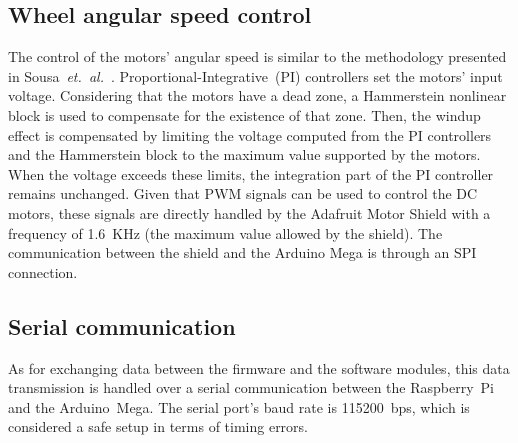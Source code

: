 \documentclass[conference]{IEEEtran}
\newcommand{\etal}{\textit{et.~al.}}
\begin{document}
\subsection{Wheel angular speed control}

The control of the motors' angular speed is similar to the methodology presented in Sousa~\etal~\cite{5dpo:sousa-2021}.
Proportional-Integrative~(PI) controllers set the motors' input voltage. Considering that the motors have a dead zone, a Hammerstein nonlinear block is used to compensate for the existence of that zone.
Then, the windup effect is compensated by limiting the voltage computed from the PI controllers and the Hammerstein block to the maximum value supported by the motors.
When the voltage exceeds these limits, the integration part of the PI controller remains unchanged.
Given that PWM signals can be used to control the DC motors, these signals are directly handled by the Adafruit Motor Shield with a frequency of 1.6~KHz (the maximum value allowed by the shield).
The communication between the shield and the Arduino Mega is through an SPI connection.



\subsection{Serial communication}

As for exchanging data between the firmware and the software modules, this data transmission is handled over a serial communication between the Raspberry~Pi and the Arduino~Mega.
The serial port's baud rate is 115200~bps, which is considered a safe setup in terms of timing errors.
\end{document}
